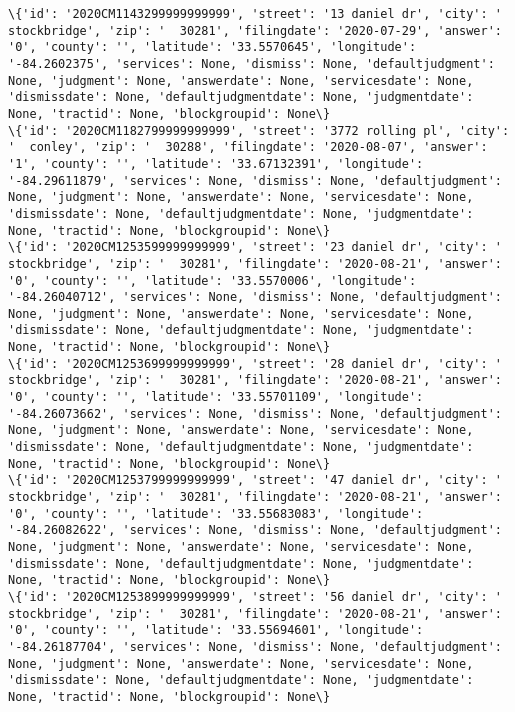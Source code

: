 \documentclass[11pt]{article}
\begin{document}
\begin{Verbatim}[commandchars=\\\{\}]
\{'id': '2020CM1143299999999999', 'street': '13 daniel dr', 'city': '  stockbridge', 'zip': '  30281', 'filingdate': '2020-07-29', 'answer': '0', 'county': '', 'latitude': '33.5570645', 'longitude': '-84.2602375', 'services': None, 'dismiss': None, 'defaultjudgment': None, 'judgment': None, 'answerdate': None, 'servicesdate': None, 'dismissdate': None, 'defaultjudgmentdate': None, 'judgmentdate': None, 'tractid': None, 'blockgroupid': None\}
\{'id': '2020CM1182799999999999', 'street': '3772 rolling pl', 'city': '  conley', 'zip': '  30288', 'filingdate': '2020-08-07', 'answer': '1', 'county': '', 'latitude': '33.67132391', 'longitude': '-84.29611879', 'services': None, 'dismiss': None, 'defaultjudgment': None, 'judgment': None, 'answerdate': None, 'servicesdate': None, 'dismissdate': None, 'defaultjudgmentdate': None, 'judgmentdate': None, 'tractid': None, 'blockgroupid': None\}
\{'id': '2020CM1253599999999999', 'street': '23 daniel dr', 'city': '  stockbridge', 'zip': '  30281', 'filingdate': '2020-08-21', 'answer': '0', 'county': '', 'latitude': '33.5570006', 'longitude': '-84.26040712', 'services': None, 'dismiss': None, 'defaultjudgment': None, 'judgment': None, 'answerdate': None, 'servicesdate': None, 'dismissdate': None, 'defaultjudgmentdate': None, 'judgmentdate': None, 'tractid': None, 'blockgroupid': None\}
\{'id': '2020CM1253699999999999', 'street': '28 daniel dr', 'city': '  stockbridge', 'zip': '  30281', 'filingdate': '2020-08-21', 'answer': '0', 'county': '', 'latitude': '33.55701109', 'longitude': '-84.26073662', 'services': None, 'dismiss': None, 'defaultjudgment': None, 'judgment': None, 'answerdate': None, 'servicesdate': None, 'dismissdate': None, 'defaultjudgmentdate': None, 'judgmentdate': None, 'tractid': None, 'blockgroupid': None\}
\{'id': '2020CM1253799999999999', 'street': '47 daniel dr', 'city': '  stockbridge', 'zip': '  30281', 'filingdate': '2020-08-21', 'answer': '0', 'county': '', 'latitude': '33.55683083', 'longitude': '-84.26082622', 'services': None, 'dismiss': None, 'defaultjudgment': None, 'judgment': None, 'answerdate': None, 'servicesdate': None, 'dismissdate': None, 'defaultjudgmentdate': None, 'judgmentdate': None, 'tractid': None, 'blockgroupid': None\}
\{'id': '2020CM1253899999999999', 'street': '56 daniel dr', 'city': '  stockbridge', 'zip': '  30281', 'filingdate': '2020-08-21', 'answer': '0', 'county': '', 'latitude': '33.55694601', 'longitude': '-84.26187704', 'services': None, 'dismiss': None, 'defaultjudgment': None, 'judgment': None, 'answerdate': None, 'servicesdate': None, 'dismissdate': None, 'defaultjudgmentdate': None, 'judgmentdate': None, 'tractid': None, 'blockgroupid': None\}

\end{Verbatim}
\end{document}
